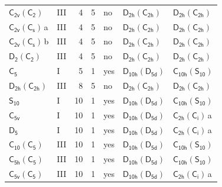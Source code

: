 \documentclass[10pt,a4paper]{article}
\numberwithin{equation}{section}
\newcommand{\grp}[1]{\mathsf{#1}}
\newcommand{\clsletter}[1]{\,{\scriptsize\color{black!55}#1}}
\begin{document}
{\begin{longtable}{@{}llrrlll@{}}
\href{C2v-C2.pdf}{$\grp{C_{2v}}(\grp{C_{2}})$} & III & 4 & 5 & no & \href{D2h-C2h.pdf}{$\grp{D_{2h}}(\grp{C_{2h}})$} & \href{D2h-C2h.pdf}{$\grp{D_{2h}}(\grp{C_{2h}})$}\\
\href{C2v-C1v.pdf}{$\grp{C_{2v}}(\grp{C_{s}})$}\clsletter{a} & III & 4 & 5 & no & \href{D2h-C2h.pdf}{$\grp{D_{2h}}(\grp{C_{2h}})$} & \href{D2h-C2h.pdf}{$\grp{D_{2h}}(\grp{C_{2h}})$}\\
\href{C2v-C1v.pdf}{$\grp{C_{2v}}(\grp{C_{s}})$}\clsletter{b} & III & 4 & 5 & no & \href{D2h-C2h.pdf}{$\grp{D_{2h}}(\grp{C_{2h}})$} & \href{D2h-C2h.pdf}{$\grp{D_{2h}}(\grp{C_{2h}})$}\\
\href{D2-C2.pdf}{$\grp{D_{2}}(\grp{C_{2}})$} & III & 4 & 5 & no & \href{D2h-C2h.pdf}{$\grp{D_{2h}}(\grp{C_{2h}})$} & \href{D2h-C2h.pdf}{$\grp{D_{2h}}(\grp{C_{2h}})$}\\
\href{../../../rotation/data/pdf/C5.pdf}{$\grp{C_{5}}$} & I & 5 & 1 & yes & \href{D10h-D5d.pdf}{$\grp{D_{10h}}(\grp{D_{5d}})$} & \href{C10h-S10.pdf}{$\grp{C_{10h}}(\grp{S_{10}})$}\\
\href{D2h-C2h.pdf}{$\grp{D_{2h}}(\grp{C_{2h}})$} & III & 8 & 5 & no & \href{D2h-C2h.pdf}{$\grp{D_{2h}}(\grp{C_{2h}})$} & \href{D2h-C2h.pdf}{$\grp{D_{2h}}(\grp{C_{2h}})$}\\
\href{../../../rotation/data/pdf/S10.pdf}{$\grp{S_{10}}$} & I & 10 & 1 & yes & \href{D10h-D5d.pdf}{$\grp{D_{10h}}(\grp{D_{5d}})$} & \href{C10h-S10.pdf}{$\grp{C_{10h}}(\grp{S_{10}})$}\\
\href{../../../rotation/data/pdf/C5v.pdf}{$\grp{C_{5v}}$} & I & 10 & 1 & yes & \href{D10h-D5d.pdf}{$\grp{D_{10h}}(\grp{D_{5d}})$} & \href{C2h-S2.pdf}{$\grp{C_{2h}}(\grp{C_{i}})$}\clsletter{a}\\
\href{../../../rotation/data/pdf/D5.pdf}{$\grp{D_{5}}$} & I & 10 & 1 & yes & \href{D10h-D5d.pdf}{$\grp{D_{10h}}(\grp{D_{5d}})$} & \href{C2h-S2.pdf}{$\grp{C_{2h}}(\grp{C_{i}})$}\clsletter{a}\\
\href{C10-C5.pdf}{$\grp{C_{10}}(\grp{C_{5}})$} & III & 10 & 1 & yes & \href{D10h-D5d.pdf}{$\grp{D_{10h}}(\grp{D_{5d}})$} & \href{C10h-S10.pdf}{$\grp{C_{10h}}(\grp{S_{10}})$}\\
\href{C5h-C5.pdf}{$\grp{C_{5h}}(\grp{C_{5}})$} & III & 10 & 1 & yes & \href{D10h-D5d.pdf}{$\grp{D_{10h}}(\grp{D_{5d}})$} & \href{C10h-S10.pdf}{$\grp{C_{10h}}(\grp{S_{10}})$}\\
\href{C5v-C5.pdf}{$\grp{C_{5v}}(\grp{C_{5}})$} & III & 10 & 1 & yes & \href{D10h-D5d.pdf}{$\grp{D_{10h}}(\grp{D_{5d}})$} & \href{C2h-S2.pdf}{$\grp{C_{2h}}(\grp{C_{i}})$}\clsletter{a}\\

\end{longtable}}
\end{document}
